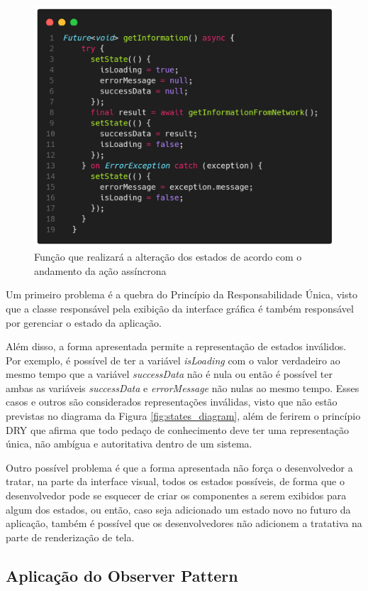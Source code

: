 \documentclass[12pt, %
openright, 
oneside, %
a4paper,    %
brazil]{facom-ufu-abntex2}
\begin{document}
\begin{figure}[ht]
    \centering
    \includegraphics[width=.65\textwidth, trim={0 30 0 100}, clip]{figures/states/adhoc_getinfo.png}
    \caption{Função que realizará a alteração dos estados de acordo com o andamento da ação assíncrona}
    \label{fig:adhoc_getinfo}
\end{figure}

Um primeiro problema é a quebra do Princípio da Responsabilidade Única, visto que a classe responsável pela exibição da interface gráfica é também responsável por gerenciar o estado da aplicação.

Além disso, a forma apresentada permite a representação de estados inválidos. Por exemplo, é possível de ter a variável \textit{isLoading} com o valor verdadeiro ao mesmo tempo que a variável \textit{successData} não é nula ou então é possível ter ambas as variáveis \textit{successData} e \textit{errorMessage} não nulas ao mesmo tempo. Esses casos e outros são considerados representações inválidas, visto que não estão previstas no diagrama da Figura \ref{fig:states_diagram}, além de ferirem o princípio DRY que afirma que todo pedaço de conhecimento deve ter uma representação única, não ambígua e autoritativa dentro de um sistema.

Outro possível problema é que a forma apresentada não força o desenvolvedor a tratar, na parte da interface visual, todos os estados possíveis, de forma que o desenvolvedor pode se esquecer de criar os componentes a serem exibidos para algum dos estados, ou então, caso seja adicionado um estado novo no futuro da aplicação, também é possível que os desenvolvedores não adicionem a tratativa na parte de renderização de tela.

\subsection{Aplicação do Observer Pattern}
\end{document}
